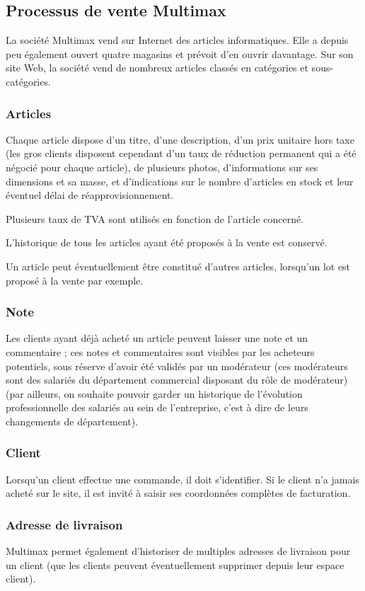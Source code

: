 \documentclass[a4paper,12pt]{article}
\author{Easylia}
\begin{document}
\subsection*{Processus de vente Multimax}
La société Multimax vend sur Internet des articles informatiques. Elle a depuis peu également ouvert quatre magasins et prévoit d'en ouvrir davantage. 
Sur son site Web, la société vend de nombreux articles classés en catégories et sous-catégories.
\subsubsection*{Articles}
Chaque article dispose d'un titre, d'une description, d'un prix unitaire hors taxe (les gros clients disposent cependant d'un taux de réduction permanent qui a été négocié pour chaque article), de plusieurs photos, d'informations sur ses dimensions et sa masse, et d'indications sur le nombre d'articles en stock et leur éventuel délai de réapprovisionnement.

Plusieurs taux de TVA sont utilisés en fonction de l'article concerné.

L'historique de tous les articles ayant été proposés à la vente est conservé.

Un article peut éventuellement être constitué d'autres articles, lorsqu'un lot est proposé à la vente par exemple.
\subsubsection*{Note}
Les clients ayant déjà acheté un article peuvent laisser une note et un commentaire ;
ces notes et commentaires sont visibles par les acheteurs potentiels, sous réserve d'avoir été validés par un modérateur (ces modérateurs sont des salariés du département commercial disposant du rôle de modérateur)
(par ailleurs, on souhaite pouvoir garder un historique de l'évolution professionnelle des salariés au sein de l'entreprise, c'est à dire de leurs changements de département).
\subsubsection*{Client}
Lorsqu'un client effectue une commande, il doit s'identifier. Si le client n'a jamais acheté sur le site, il est invité à saisir ses coordonnées complètes de facturation.
\subsubsection*{Adresse de livraison}
Multimax permet également d'historiser de multiples adresses de livraison pour un client (que les clients peuvent éventuellement supprimer depuis leur espace client).
\end{document}
